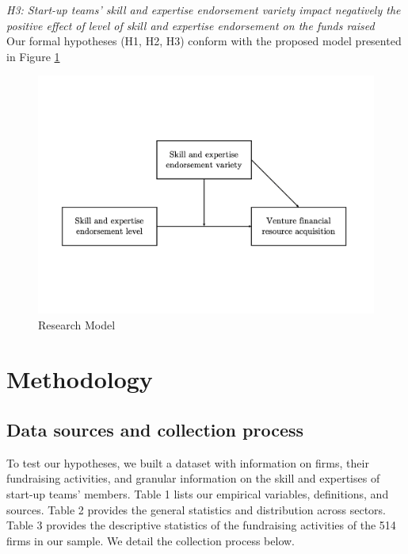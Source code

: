 \documentclass[12pt]{article}
\begin{document}
\noindent \textit{H3: Start-up teams' skill and expertise endorsement variety impact negatively the positive effect of level of skill and expertise endorsement on the funds raised} \\

Our formal hypotheses (H1, H2, H3) conform with the proposed model presented in Figure \ref{Figure1}

\begin{figure}[!b]
  \includegraphics[width=\linewidth, scale=0.5]{model.pdf}
  \caption{Research Model}
  \label{Figure1}
\end{figure}

\section{Methodology}

\subsection{Data sources and collection process}

To test our hypotheses, we built a dataset with information on firms, their fundraising activities, and granular information on the skill and expertises of start-up teams' members. Table 1\label{table1} lists our empirical variables, definitions, and sources. Table 2\label{table2} provides the general statistics and distribution across sectors. Table 3\label{table3} provides the descriptive statistics of the fundraising activities of the 514 firms in our sample. We detail the collection process below. \\
\end{document}
